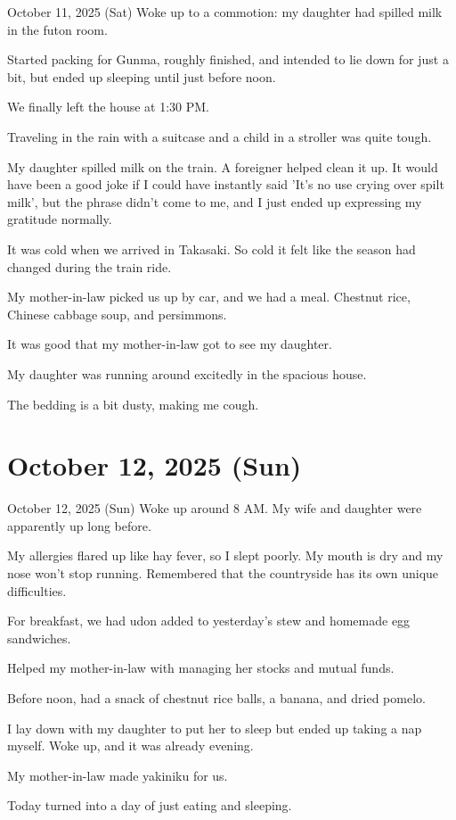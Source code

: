 \documentclass[dvipdfmx, autodetect-engine, aspectratio=169, 10.5pt]{beamer}
\begin{document}
\begin{frame}{October 11, 2025 (Sat)}
Woke up to a commotion: my daughter had spilled milk in the futon room.

Started packing for Gunma, roughly finished, and intended to lie down for just a bit, but ended up sleeping until just before noon.

We finally left the house at 1:30 PM.

Traveling in the rain with a suitcase and a child in a stroller was quite tough.

My daughter spilled milk on the train. A foreigner helped clean it up.
It would have been a good joke if I could have instantly said 'It's no use crying over spilt milk', but the phrase didn't come to me, and I just ended up expressing my gratitude normally.

It was cold when we arrived in Takasaki. So cold it felt like the season had changed during the train ride.

My mother-in-law picked us up by car, and we had a meal.
Chestnut rice, Chinese cabbage soup, and persimmons.

It was good that my mother-in-law got to see my daughter.

My daughter was running around excitedly in the spacious house.

The bedding is a bit dusty, making me cough.
\end{frame}

\section{October 12, 2025 (Sun)}

\begin{frame}{October 12, 2025 (Sun)}
Woke up around 8 AM. My wife and daughter were apparently up long before.

My allergies flared up like hay fever, so I slept poorly.
My mouth is dry and my nose won't stop running.
Remembered that the countryside has its own unique difficulties.

For breakfast, we had udon added to yesterday's stew and homemade egg sandwiches.

Helped my mother-in-law with managing her stocks and mutual funds.

Before noon, had a snack of chestnut rice balls, a banana, and dried pomelo.

I lay down with my daughter to put her to sleep but ended up taking a nap myself. Woke up, and it was already evening.

My mother-in-law made yakiniku for us.

Today turned into a day of just eating and sleeping.
\end{frame}
\end{document}
